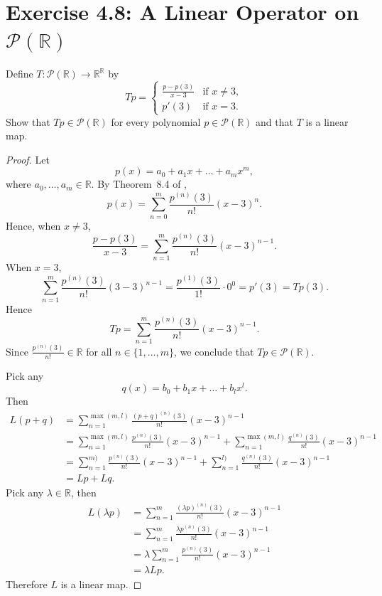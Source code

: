 \section{Exercise 4.8: A Linear Operator on $\mathcal{P}(\mathbb{R})$}
Define $T:\mathcal{P}(\mathbb{R})\to\mathbb{R}^\mathbb{R}$ by\[
Tp=\begin{cases} 
\frac{p-p(3)}{x-3} & \text{if } x\ne3,\\
p'(3) & \text{if } x=3.
\end{cases}
\]Show that $Tp\in\mathcal{P}(\mathbb{R})$ for every polynomial $p\in\mathcal{P}(\mathbb{R})$ and that $T$ is a linear map.
\begin{proof}
Let\[
p(x)=a_0+a_1x+\dots+a_mx^m,
\]where $a_0,\dots,a_m\in\mathbb{R}$. By Theorem~8.4 of \cite{rudin1976principles},\[
p(x)=\sum_{n=0}^{m}\frac{p^{(n)}(3)}{n!}(x-3)^n.
\]Hence, when $x\ne3$,\[
\frac{p-p(3)}{x-3}=\sum_{n=1}^{m}\frac{p^{(n)}(3)}{n!}(x-3)^{n-1}.
\]When $x=3$,\[
\sum_{n=1}^{m}\frac{p^{(n)}(3)}{n!}(3-3)^{n-1}=\frac{p^{(1)}(3)}{1!}\cdot0^0=p'(3)=Tp(3).
\]Hence\[
Tp=\sum_{n=1}^{m}\frac{p^{(n)}(3)}{n!}(x-3)^{n-1}.
\]Since $\frac{p^{(n)}(3)}{n!}\in\mathbb{R}$ for all $n\in\{1,\dots,m\}$, we conclude that $Tp\in\mathcal{P}(\mathbb{R})$.

Pick any\[
q(x)=b_0+b_1x+\dots+b_lx^l.
\]Then\[
\begin{split}
L(p+q)&=\sum_{n=1}^{\max(m,l)}\frac{(p+q)^{(n)}(3)}{n!}(x-3)^{n-1}\\
&=\sum_{n=1}^{\max(m,l)}\frac{p^{(n)}(3)}{n!}(x-3)^{n-1} + \sum_{n=1}^{\max(m,l)}\frac{q^{(n)}(3)}{n!}(x-3)^{n-1}\\
&=\sum_{n=1}^{m)}\frac{p^{(n)}(3)}{n!}(x-3)^{n-1} + \sum_{n=1}^{l)}\frac{q^{(n)}(3)}{n!}(x-3)^{n-1}\\
&=Lp+Lq.
\end{split}
\]Pick any $\lambda\in\mathbb{R}$, then\[
\begin{split}
L(\lambda p)&=\sum_{n=1}^{m}\frac{(\lambda p)^{(n)}(3)}{n!}(x-3)^{n-1}\\
&=\sum_{n=1}^{m}\frac{\lambda p^{(n)}(3)}{n!}(x-3)^{n-1}\\
&=\lambda\sum_{n=1}^{m}\frac{p^{(n)}(3)}{n!}(x-3)^{n-1}\\
&=\lambda Lp.
\end{split}
\]Therefore $L$ is a linear map.
\end{proof}
